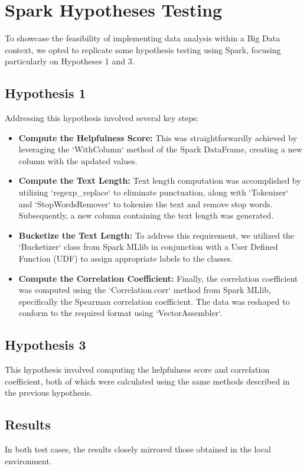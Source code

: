 \section{Spark Hypotheses Testing}
To showcase the feasibility of implementing data analysis within a Big Data context, we opted to replicate some hypothesis testing using 
Spark, focusing particularly on Hypotheses 1 and 3.

\subsection*{Hypothesis 1}
Addressing this hypothesis involved several key steps:

\begin{itemize}[leftmargin=*, noitemsep]
    \item \textbf{Compute the Helpfulness Score:}
    This was straightforwardly achieved by leveraging the `WithColumn` method of the Spark DataFrame, creating a new column with the updated values.
    
    \item \textbf{Compute the Text Length:}
    Text length computation was accomplished by utilizing `regexp\_replace` to eliminate punctuation, along with `Tokenizer` and `StopWordsRemover` 
    to tokenize the text and remove stop words. Subsequently, a new column containing the text length was generated.
    
    \item \textbf{Bucketize the Text Length:}
    To address this requirement, we utilized the `Bucketizer` class from Spark MLlib in conjunction with a User Defined Function (UDF) to 
    assign appropriate labels to the classes.
    
    \item \textbf{Compute the Correlation Coefficient:}
    Finally, the correlation coefficient was computed using the `Correlation.corr` method from Spark MLlib, specifically the Spearman correlation 
    coefficient. The data was reshaped to conform to the required format using `VectorAssembler`.
    
\end{itemize}

\subsection*{Hypothesis 3}
This hypothesis involved computing the helpfulness score and correlation coefficient, both of which were calculated using the same methods 
described in the previous hypothesis.

\subsection*{Results}
In both test cases, the results closely mirrored those obtained in the local environment.

